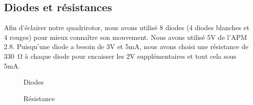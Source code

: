 \subsection {Diodes  et résistances}
Afin d'éclairer notre quadrirotor, nous avons utilisé 8 diodes (4 diodes blanches et 4  rouges) pour mieux connaître son mouvement. Nous avons utilisé 5V de l'APM 2.8. Puisqu'une diode a besoin de 3V et 5mA, nous avons choisi une résistance de \SI{330}{\ohm} à chaque diode pour encaisser les 2V supplémentaires et tout cela sous 5mA.
\begin{figure}[H]
	\centering
	\begin{minipage}{0.49\textwidth}
		\hspace*{-0.6cm}
		\centering
		\caption{Diodes}
		\label{fig:my_label}
	\end{minipage}
	\begin{minipage}{0.49\textwidth}
		\hspace*{0.2cm}	
		\centering
		\caption{Résistance}
		\label{fig:my_label}
	\end{minipage}
\end{figure}

